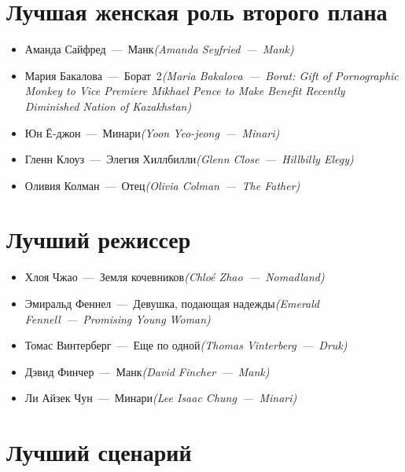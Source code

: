 \documentclass[a4paper,10pt]{article}
\begin{document}
\begin{multicols}{2}
\section{Лучшая женская роль второго плана}

\begin{itemize}
	\item Аманда Сайфред — Манк\newline\textit{(Amanda Seyfried — Mank)}
	\item Мария Бакалова — Борат 2\newline\textit{(Maria Bakalova — Borat: Gift of Pornographic Monkey to Vice Premiere Mikhael Pence to Make Benefit Recently Diminished Nation of Kazakhstan)}
	\item Юн Ё-джон — Минари\newline\textit{(Yoon Yeo-jeong — Minari)}
	\item Гленн Клоуз — Элегия Хиллбилли\newline\textit{(Glenn Close — Hillbilly Elegy)}
	\item Оливия Колман — Отец\newline\textit{(Olivia Colman — The Father)}
\end{itemize}

\section{Лучший режиссер}

\begin{itemize}
	\item Хлоя Чжао — Земля кочевников\newline\textit{(Chloé Zhao — Nomadland)}
	\item Эмиральд Феннел — Девушка, подающая надежды\newline\textit{(Emerald Fennell — Promising Young Woman)}
	\item Томас Винтерберг — Еще по одной\newline\textit{(Thomas Vinterberg — Druk)}
	\item Дэвид Финчер — Манк\newline\textit{(David Fincher — Mank)}
	\item Ли Айзек Чун — Минари\newline\textit{(Lee Isaac Chung — Minari)}
\end{itemize}

\section{Лучший сценарий}


\end{multicols}
\end{document}
